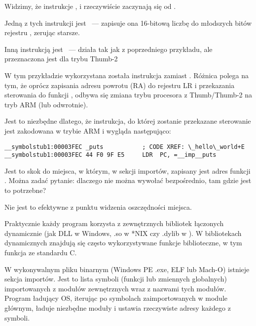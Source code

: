 Widzimy, że instrukcje ,  i  rzeczywiście zaczynają się od .

Jedną z tych instrukcji jest
~--- zapisuje ona 16-bitową liczbę do młodszych bitów rejestru , zerując starsze.

Inną instrukcją jest ~---  działa tak jak  z poprzedniego przykładu, ale przeznaczona jest dla trybu Thumb-2

W tym przykładzie wykorzystana została instrukcja  zamiast .
Różnica polega na tym, że oprócz zapisania adresu powrotu (\ac{RA}) do rejestru \ac{LR} i przekazania sterowania
do funkcji \puts, odbywa się zmiana trybu procesora z Thumb/Thumb-2 na tryb ARM (lub odwrotnie).

Jest to niezbędne dlatego, że instrukcja, do której zostanie przekazane sterowanie jest zakodowana w trybie ARM i wygląda następująco:

\begin{lstlisting}[style=customasmARM]
__symbolstub1:00003FEC _puts           ; CODE XREF: \_hello\_world+E
__symbolstub1:00003FEC 44 F0 9F E5     LDR  PC, =__imp__puts
\end{lstlisting}

Jest to skok do miejsca, w którym, w sekcji importów, zapisany jest adres funkcji \puts.
Można zadać pytanie: dlaczego nie można wywołać \puts bezpośrednio, tam gdzie jest to potrzebne?

Nie jest to efektywne z punktu widzenia oszczędności miejsca.

Praktycznie każdy program korzysta z zewnętrznych bibliotek łączonych dynamicznie (jak DLL w Windows, .so w *NIX
czy .dylib w \MacOSX).
W bibliotekach dynamicznych znajdują się często wykorzystywane funkcje biblioteczne, w tym funkcja \puts ze standardu C.

W wykonywalnym pliku binarnym (Windows PE .exe, ELF lub Mach-O) istnieje sekcja importów.
Jest to lista symboli (funkcji lub zmiennych globalnych) importowanych z modułów zewnętrznych wraz z nazwami tych modułów.
Program ładujący \ac{OS}, iterując po symbolach zaimportowanych w module głównym, ładuje niezbędne moduły i ustawia rzeczywiste adresy każdego z symboli.

